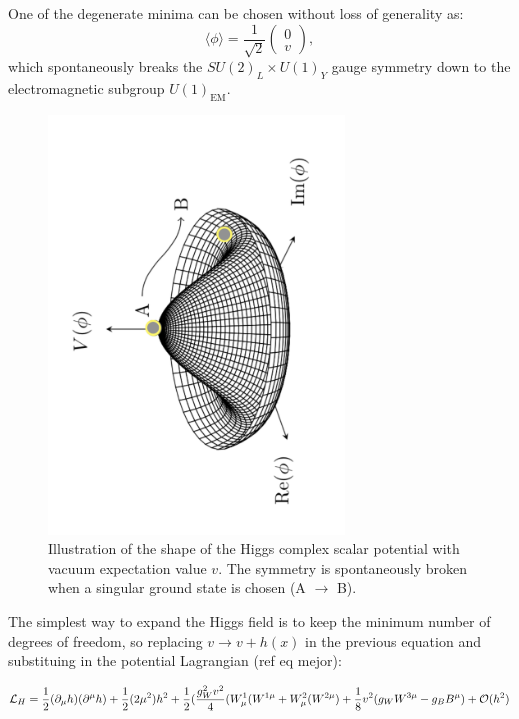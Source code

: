 \documentclass[11pt,twoside]{book}
\begin{document}
One of the degenerate minima can be chosen without loss of generality as:
\begin{equation}
\langle \phi \rangle = \frac{1}{\sqrt{2}} \begin{pmatrix}
0 \\
v
\end{pmatrix},
\end{equation}
which spontaneously breaks the $SU(2)_L \times U(1)_Y$ gauge symmetry down to the electromagnetic subgroup $U(1)_{\text{EM}}$.

\begin{figure}[htbp]
  \centering
  \includegraphics[angle=-90,width=0.7\textwidth]{images/mexican_hat.pdf}
  \caption{Illustration of the shape of the Higgs complex scalar potential with vacuum expectation value $v$. The symmetry is spontaneously broken when a singular ground state is chosen (A $\rightarrow$ B).}
  \label{fig:mexican_hat}
\end{figure}

The simplest way to expand the Higgs field is to keep the minimum number of degrees of freedom, so replacing $v\rightarrow v+h(x)$ in the previous equation and substituing in the potential Lagrangian (ref eq mejor): 

\begin{equation}
\mathcal{L}_{H} = \frac{1}{2}(\partial_{\mu}h)(\partial^{\mu}h) + \frac{1}{2}(2\mu^2)h^2  \\
 + \frac{1}{2}(\frac{g^2_{W}v^2}{4}(W_{\mu}^1(W^{1\mu}+W_{\mu}^2(W^{2\mu})\\
 +\frac{1}{8}v^2(g_{W}W^{3\mu}-g_{B}B^{\mu}) \\
 + \mathcal{O}(h^2)
\end{equation}
\end{document}
